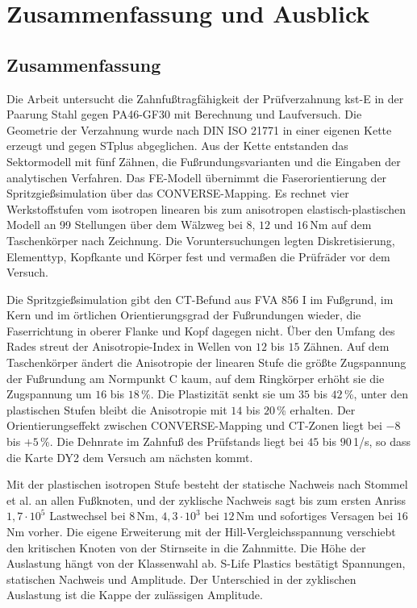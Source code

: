 \chapter{Zusammenfassung und Ausblick}
\label{chap:zusammenfassung}

\section{Zusammenfassung}
\label{sec:zusammenfassung}

Die Arbeit untersucht die Zahnfußtragfähigkeit der Prüfverzahnung kst-E in der Paarung Stahl gegen PA46-GF30 mit Berechnung und Laufversuch. Die Geometrie der Verzahnung wurde nach DIN ISO 21771 in einer eigenen Kette erzeugt und gegen STplus abgeglichen. Aus der Kette entstanden das Sektormodell mit fünf Zähnen, die Fußrundungsvarianten und die Eingaben der analytischen Verfahren. Das FE-Modell übernimmt die Faserorientierung der Spritzgießsimulation über das CONVERSE-Mapping. Es rechnet vier Werkstoffstufen vom isotropen linearen bis zum anisotropen elastisch-plastischen Modell an 99 Stellungen über dem Wälzweg bei $8$, $12$ und $16$\,Nm auf dem Taschenkörper nach Zeichnung. Die Voruntersuchungen legten Diskretisierung, Elementtyp, Kopfkante und Körper fest und vermaßen die Prüfräder vor dem Versuch.

Die Spritzgießsimulation gibt den CT-Befund aus FVA 856 I im Fußgrund, im Kern und im örtlichen Orientierungsgrad der Fußrundungen wieder, die Faserrichtung in oberer Flanke und Kopf dagegen nicht. Über den Umfang des Rades streut der Anisotropie-Index in Wellen von $12$ bis $15$ Zähnen. Auf dem Taschenkörper ändert die Anisotropie der linearen Stufe die größte Zugspannung der Fußrundung am Normpunkt C kaum, auf dem Ringkörper erhöht sie die Zugspannung um $16$ bis $18$\,\%. Die Plastizität senkt sie um $35$ bis $42$\,\%, unter den plastischen Stufen bleibt die Anisotropie mit $14$ bis $20$\,\% erhalten. Der Orientierungseffekt zwischen CONVERSE-Mapping und CT-Zonen liegt bei $-8$ bis $+5$\,\%. Die Dehnrate im Zahnfuß des Prüfstands liegt bei $45$ bis $90$\,1/s, so dass die Karte DY2 dem Versuch am nächsten kommt.

Mit der plastischen isotropen Stufe besteht der statische Nachweis nach Stommel et al. an allen Fußknoten, und der zyklische Nachweis sagt bis zum ersten Anriss $1{,}7 \cdot 10^{5}$ Lastwechsel bei $8$\,Nm, $4{,}3 \cdot 10^{3}$ bei $12$\,Nm und sofortiges Versagen bei $16$\,Nm vorher. Die eigene Erweiterung mit der Hill-Vergleichs\-spannung verschiebt den kritischen Knoten von der Stirnseite in die Zahnmitte. Die Höhe der Auslastung hängt von der Klassenwahl ab. S-Life Plastics bestätigt Spannungen, statischen Nachweis und Amplitude. Der Unterschied in der zyklischen Auslastung ist die Kappe der zulässigen Amplitude.

